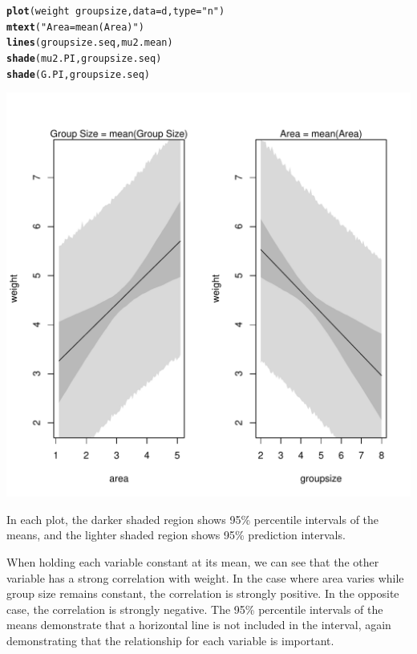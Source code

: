 \documentclass[12pt]{article}\usepackage[]{graphicx}\usepackage[]{color}
\makeatletter
\def\maxwidth{ %
  \ifdim\Gin@nat@width>\linewidth
    \linewidth
  \else
    \Gin@nat@width
  \fi
}
\newcommand{\hlstr}[1]{\textcolor[rgb]{0.192,0.494,0.8}{#1}}%
\newcommand{\hlopt}[1]{\textcolor[rgb]{0,0,0}{#1}}%
\newcommand{\hlstd}[1]{\textcolor[rgb]{0.345,0.345,0.345}{#1}}%
\newcommand{\hlkwc}[1]{\textcolor[rgb]{0.333,0.667,0.333}{#1}}%
\newcommand{\hlkwd}[1]{\textcolor[rgb]{0.737,0.353,0.396}{\textbf{#1}}}%
\newenvironment{kframe}{%
 \def\at@end@of@kframe{}%
 \ifinner\ifhmode%
  \def\at@end@of@kframe{\end{minipage}}%
  \begin{minipage}{\columnwidth}%
 \fi\fi%
 \def\FrameCommand##1{\hskip\@totalleftmargin \hskip-\fboxsep
 \colorbox{shadecolor}{##1}\hskip-\fboxsep
     \hskip-\linewidth \hskip-\@totalleftmargin \hskip\columnwidth}%
 \MakeFramed {\advance\hsize-\width
   \@totalleftmargin\z@ \linewidth\hsize
   \@setminipage}}%
 {\par\unskip\endMakeFramed%
 \at@end@of@kframe}
\newenvironment{knitrout}{}{} %
\makeatother
\begin{document}
\begin{knitrout}
\begin{kframe}
\begin{alltt}
\hlkwd{plot}\hlstd{(weight} \hlopt{~} \hlstd{groupsize,} \hlkwc{data} \hlstd{= d,} \hlkwc{type} \hlstd{=} \hlstr{"n"}\hlstd{)}
\hlkwd{mtext}\hlstd{(}\hlstr{"Area = mean(Area)"}\hlstd{)}
\hlkwd{lines}\hlstd{(groupsize.seq, mu2.mean)}
\hlkwd{shade}\hlstd{(mu2.PI, groupsize.seq)}
\hlkwd{shade}\hlstd{(G.PI, groupsize.seq)}
\end{alltt}
\end{kframe}
\includegraphics[width=\maxwidth]{figure/unnamed-chunk-6-1} 

\end{knitrout}

In each plot, the darker shaded region shows 95\% percentile intervals of the means, and the lighter shaded region shows 95\% prediction intervals.

When holding each variable constant at its mean, we can see that the other variable has a strong correlation with weight. In the case where area varies while group size remains constant, the correlation is strongly positive. In the opposite case, the correlation is strongly negative. The 95\% percentile intervals of the means demonstrate that a horizontal line is not included in the interval, again demonstrating that the relationship for each variable is important.
\end{document}
